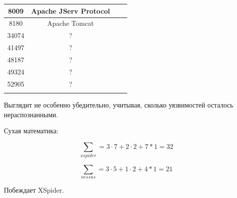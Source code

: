 \begin{table}[H]
{\begin{tabular}{cccl}
			\multicolumn{1}{|c|}{8009}  & \multicolumn{1}{c|}{Apache JServ Protocol}                       & \multicolumn{1}{c|}{}                   & \multicolumn{1}{l|}{}                  \\ \hline
			\multicolumn{1}{|c|}{8180}  & \multicolumn{1}{c|}{Apache Tomcat}                               & \multicolumn{1}{c|}{}                   & \multicolumn{1}{l|}{}                  \\ \hline
			\multicolumn{1}{|c|}{34074} & \multicolumn{1}{c|}{?}                                           & \multicolumn{1}{c|}{}                   & \multicolumn{1}{l|}{}                  \\ \hline
			\multicolumn{1}{|c|}{41497} & \multicolumn{1}{c|}{?}                                           & \multicolumn{1}{c|}{}                   & \multicolumn{1}{l|}{}                  \\ \hline
			\multicolumn{1}{|c|}{48187} & \multicolumn{1}{c|}{?}                                           & \multicolumn{1}{c|}{}                   & \multicolumn{1}{l|}{}                  \\ \hline
			\multicolumn{1}{|c|}{49324} & \multicolumn{1}{c|}{?}                                           & \multicolumn{1}{c|}{}                   & \multicolumn{1}{l|}{}                  \\ \hline
			\multicolumn{1}{|c|}{52905} & \multicolumn{1}{c|}{?}                                           & \multicolumn{1}{c|}{}                   & \multicolumn{1}{l|}{}                  \\ \hline
			\multicolumn{1}{l}{}        & \multicolumn{1}{l}{}                                             & \multicolumn{1}{l}{}                    &                                       
		\end{tabular}%
	}
\end{table}

Выглядит не особенно убедительно, учитывая, сколько уязвимостей осталось нераспознанными. 

Сухая математика:

\[
\sum_{xspider}=3 \cdot 7 + 2 \cdot 2 + 7 * 1 = 32
\]

\[
\sum_{nessus}=3 \cdot 5 + 1 \cdot 2 + 4 * 1 = 21
\]

Побеждает XSpider.


